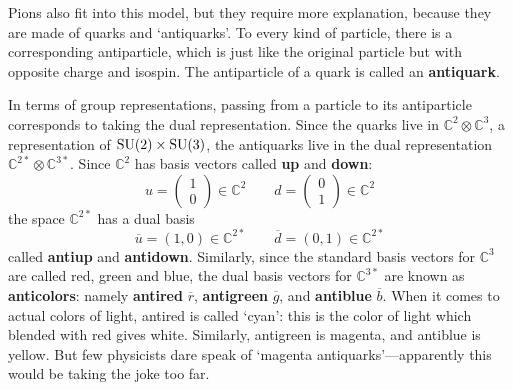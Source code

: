 \documentclass[12pt]{article}
\newcommand{\C}{{\mathbb C}}  %
\newcommand{\SU}{{\rm SU}}    %
\newcommand{\ubar}{\overline{u}} %
\newcommand{\dbar}{\overline{d}} %
\newcommand{\rbar}{{\overline{r}}} %
\newcommand{\gbar}{{\overline{g}}} %
\newcommand{\bbar}{{\overline{b}}} %
\begin{document}
Pions also fit into this model, but they require more explanation, because they
are made of quarks and `antiquarks'. To every kind of particle, there is a
corresponding antiparticle, which is just like the original particle but with
opposite charge and isospin.   The antiparticle of a quark is called an
\textbf{antiquark}.

In terms of group representations, passing from a particle to its 
antiparticle corresponds to taking the dual representation.  
Since the quarks live in $\C^2 \otimes \C^3$, a representation 
of $\SU(2) \times \SU(3)$, the antiquarks live in the dual 
representation $\C^{2*} \otimes \C^{3*}$.  
Since $\C^2$ has basis vectors called {\bf up} and {\bf down}:
\[  
u = \left( \begin{array}{c} 1 \\ 0 \end{array} \right) \in \C^2  \qquad
d = \left( \begin{array}{c} 0 \\ 1 \end{array} \right) \in \C^2
\]
the space $\C^{2*}$ has a dual basis
\[	\ubar = \left( 1, 0 \right) \in \C^{2*}	 \qquad
        \dbar = \left( 0, 1 \right) \in \C^{2*}	\]
called \textbf{antiup} and \textbf{antidown}.  Similarly, since the
standard basis vectors for $\C^3$ are called red, green and blue, 
the dual basis vectors for $\C^{3*}$ are known as \textbf{anticolors}: namely
\textbf{antired} $\rbar$, \textbf{antigreen} $\gbar$, and \textbf{antiblue} 
$\bbar$.  When it comes to actual colors of light, antired is 
called `cyan': this is the color of light which blended with red gives
white.  Similarly, antigreen is magenta, and antiblue is yellow.  But 
few physicists dare speak of `magenta antiquarks'---apparently this
would be taking the joke too far.
\end{document}
